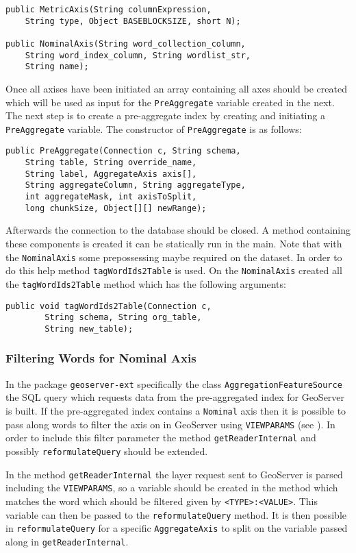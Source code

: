 \begin{lstlisting}
public MetricAxis(String columnExpression,
	String type, Object BASEBLOCKSIZE, short N);
	
public NominalAxis(String word_collection_column, 
	String word_index_column, String wordlist_str, 
	String name);
\end{lstlisting}

Once all axises have been initiated an array containing all axes should be created which will be used as input for the \lstinline|PreAggregate| variable created in the next. The next step is to create a pre-aggregate index by creating and initiating a \lstinline|PreAggregate| variable. The constructor of \lstinline|PreAggregate| is as follows:

\begin{lstlisting}
public PreAggregate(Connection c, String schema,
	String table, String override_name,
	String label, AggregateAxis axis[],
	String aggregateColumn, String aggregateType,
	int aggregateMask, int axisToSplit,
	long chunkSize, Object[][] newRange);
\end{lstlisting}

Afterwards the connection to the database should be closed. A method containing these components is created it can be statically run in the main. Note that with the \lstinline|NominalAxis| some prepossessing maybe required on the dataset. In order to do this help method \lstinline|tagWordIds2Table| is used. On the \lstinline|NominalAxis| created all the \lstinline|tagWordIds2Table| method which has the following arguments:

\begin{lstlisting}
public void tagWordIds2Table(Connection c, 
		String schema, String org_table, 
		String new_table);
\end{lstlisting}

\subsubsection{Filtering Words for Nominal Axis}
\label{sec:filtering}
In the package \lstinline|geoserver-ext| specifically the class \lstinline|AggregationFeatureSource| the SQL query which requests data from the pre-aggregated index for GeoServer is built. If the pre-aggregated index contains a \lstinline|Nominal| axis then it is possible to pass along words to filter the axis on in GeoServer using \lstinline|VIEWPARAMS| (see ). In order to include this filter parameter the method \lstinline|getReaderInternal| and possibly \lstinline|reformulateQuery| should be extended.

In the method \lstinline|getReaderInternal| the layer request sent to GeoServer is parsed including the \lstinline|VIEWPARAMS|, so a variable should be created in the method which matches the word which should be filtered given by \lstinline|<TYPE>:<VALUE>|. This variable can then be passed to the \lstinline|reformulateQuery| method. It is then possible in \lstinline|reformulateQuery| for a specific \lstinline|AggregateAxis| to split on the variable passed along in \lstinline|getReaderInternal|.